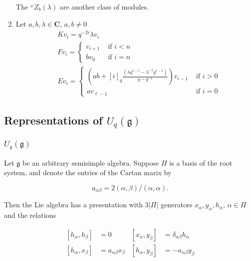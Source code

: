 \documentclass[]{article}
\numberwithin{equation}{subsection}
\begin{document}
\begin{enumerate}
    The $^\omega Z_b(\lambda)$ are another class of modules.
\item Let $a,b,\lambda \in \mathbf{C}$, $a,b\neq 0$
\begin{align*}
    &K v_i = q^{-2i} \lambda v_i \\
    &F v_i = \begin{cases} 
                v_{i+1}& \text{ if $i < n$} \\  
                b v_0& \text{ if $i = n$} 
             \end{cases}  \\
    &E v_i = \begin{cases} 
                \left(ab + [i]_q \frac{(\lambda q^{1-i} - \lambda^{-1} q^{i-1})}{q - q^{-1}}\right) v_{i-1}& \text{ if $i > 0$} \\ 
                a v_{\ell - 1}& \text{ if $i = 0$} 
             \end{cases} 
\end{align*}
\end{enumerate}


\subsection{Representations of $U_q(\mathfrak{g})$}
    \subsubsection{$U_q(\mathfrak{g})$}


        Let $\mathfrak{g}$ be an arbitrary semisimple algebra. Suppose $\Pi$ is
        a basis of the root system, and denote the entries of the Cartan marix
        by 

        \begin{equation}
            a_{\alpha\beta} = 2(\alpha, \beta) / (\alpha, \alpha).
        \end{equation}

        Then the Lie algebra has a presentation with $3|\Pi|$ generators $x_\alpha, y_\alpha, h_\alpha$, $\alpha \in \Pi$ and the relations 

        \begin{align}
            \left[ h_\alpha, h_\beta \right] &= 0       &   \left[ x_\alpha, y_\beta \right] &= \delta_{\alpha\beta} h_\alpha \\
            \left[ h_\alpha, x_\beta \right] &= a_{\alpha\beta} x_\beta  &   \left[ h_\alpha, y_\beta \right] &= -a_{\alpha\beta} y_\beta \\
        \end{align}
\end{document}
